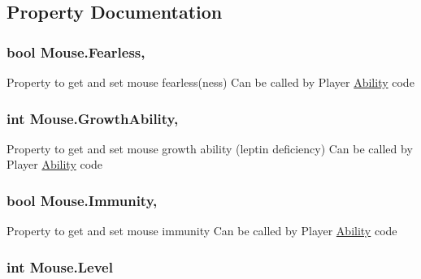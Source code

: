 \subsection{Property Documentation}
\subsubsection[{\texorpdfstring{Fearless}{Fearless}}]{\setlength{\rightskip}{0pt plus 5cm}bool Mouse.\+Fearless\hspace{0.3cm}{\ttfamily [get]}, {\ttfamily [set]}}\hypertarget{class_mouse_aa866c3f02e0e310895d8e5ef4bca6db5}{}\label{class_mouse_aa866c3f02e0e310895d8e5ef4bca6db5}


Property to get and set mouse fearless(ness) Can be called by Player \hyperlink{class_ability}{Ability} code 

\subsubsection[{\texorpdfstring{Growth\+Ability}{GrowthAbility}}]{\setlength{\rightskip}{0pt plus 5cm}int Mouse.\+Growth\+Ability\hspace{0.3cm}{\ttfamily [get]}, {\ttfamily [set]}}\hypertarget{class_mouse_a58afb42b0fa0f4d9fb30795d68a86b82}{}\label{class_mouse_a58afb42b0fa0f4d9fb30795d68a86b82}


Property to get and set mouse growth ability (leptin deficiency) Can be called by Player \hyperlink{class_ability}{Ability} code 

\subsubsection[{\texorpdfstring{Immunity}{Immunity}}]{\setlength{\rightskip}{0pt plus 5cm}bool Mouse.\+Immunity\hspace{0.3cm}{\ttfamily [get]}, {\ttfamily [set]}}\hypertarget{class_mouse_a7916f98be8b4afcd422794bbf8994e25}{}\label{class_mouse_a7916f98be8b4afcd422794bbf8994e25}


Property to get and set mouse immunity Can be called by Player \hyperlink{class_ability}{Ability} code 

\subsubsection[{\texorpdfstring{Level}{Level}}]{\setlength{\rightskip}{0pt plus 5cm}int Mouse.\+Level\hspace{0.3cm}{\ttfamily [get]}}\hypertarget{class_mouse_a76debda38af30b4b2249757bc316f66e}{}\label{class_mouse_a76debda38af30b4b2249757bc316f66e}


